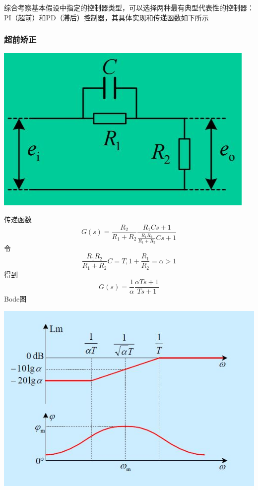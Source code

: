 \documentclass[UTF8,a4paper]{paper}
\begin{document}
综合考察基本假设中指定的控制器类型，可以选择两种最有典型代表性的控制器：PI（超前）和PD（滞后）控制器，其具体实现和传递函数如下所示
\begin{multicols}{2}
\subsubsection{超前矫正}
\begin{figurehere}
\centering
\includegraphics[width=\columnwidth]{pd.jpg}
\end{figurehere}
传递函数
\begin{equation}
G(s)=\frac{R_2}{R_1+R_2}\frac{R_1Cs+1}{\frac{R_1R_2}{R_1+R_2}Cs+1}
\end{equation}
令
$$\frac{R_1R_2}{R_1+R_2}C=T,1+\frac{R_1}{R_2}=\alpha>1$$
得到
\begin{equation}
G(s)=\frac{1}{\alpha}\frac{\alpha Ts+1}{Ts+1}
\end{equation}
Bode图

\begin{figurehere}
\centering
\includegraphics[width=\columnwidth]{bodepd.jpg}
\end{figurehere}

\end{multicols}
\end{document}

